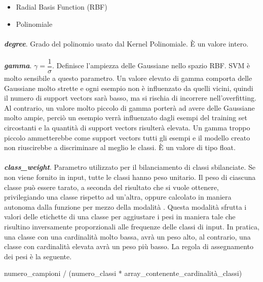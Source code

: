 \begin{itemize}
    \item Radial Basis Function (RBF) 
    \item Polinomiale
\end{itemize}

\paragraph*{}
\textbf{\textit{degree}}. Grado del polinomio usato dal Kernel Polinomiale. È un valore intero.

\paragraph*{}
\textbf{\textit{gamma}}. $\gamma = \dfrac{1}{\sigma}$. Definisce l'ampiezza delle Gaussiane nello spazio RBF. SVM è molto sensibile a questo parametro. Un valore elevato di gamma comporta delle Gaussiane molto strette e ogni esempio non è influenzato da quelli vicini, quindi il numero di support vectors sarà basso, ma si rischia di incorrere nell'overfitting. Al contrario, un valore molto piccolo di gamma porterà ad avere delle Gaussiane molto ampie, perciò un esempio verrà influenzato dagli esempi del training set circostanti e la quantità di support vectors risulterà elevata. Un gamma troppo piccolo ammetterebbe come support vectors tutti gli esempi e il modello creato non riuscirebbe a discriminare al meglio le classi. È un valore di tipo float.

\paragraph*{}
\textbf{\textit{class\_weight}}. Parametro utilizzato per il bilanciamento di classi sbilanciate. Se non viene fornito in input, tutte le classi hanno peso unitario. Il peso di ciascuna classe può essere tarato, a seconda del risultato che si vuole ottenere, privilegiando una classe rispetto ad un'altra, oppure calcolato in maniera autonoma dalla funzione per mezzo della modalità . 
Questa modalità sfrutta i valori delle etichette di una classe per aggiustare i pesi in maniera tale che risultino inversamente proporzionali alle frequenze delle classi di input. In pratica, una classe con una cardinalità molto bassa, avrà un peso alto, al contrario, una classe con cardinalità elevata avrà un peso più basso. La regola di assegnamento dei pesi è la seguente.

\begin{center}
numero\_campioni / (numero\_classi * array\_contenente\_cardinalità\_classi)
\end{center}


